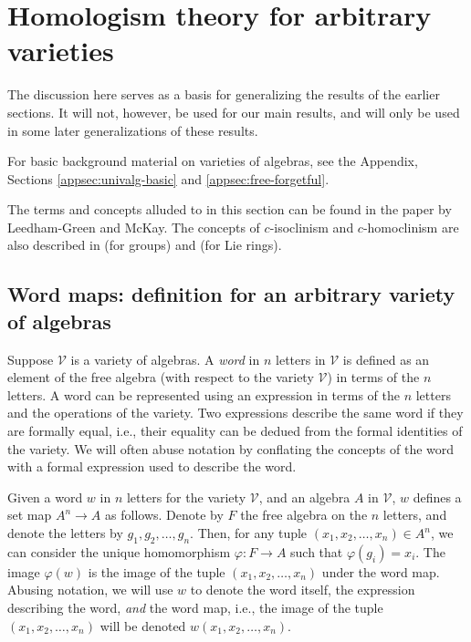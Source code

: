 \documentclass{ucetd}
\begin{document}
\section{Homologism theory for arbitrary varieties}\label{appsec:homologism-theory}

The discussion here serves as a basis for generalizing the results of
the earlier sections. It will not, however, be used for our main
results, and will only be used in some later generalizations of these
results.

For basic background material on varieties of algebras, see the
Appendix, Sections \ref{appsec:univalg-basic} and
\ref{appsec:free-forgetful}.

The terms and concepts alluded to in this section can be found in the
paper \cite{Baerinvariantsandisolosigms} by Leedham-Green and
McKay. The concepts of $c$-isoclinism and $c$-homoclinism are also
described in \cite{Hekster} (for groups) and \cite{Moghaddametal} (for
Lie rings).

\subsection{Word maps: definition for an arbitrary variety of algebras}\label{appsec:word-maps}

Suppose $\mathcal{V}$ is a variety of algebras. A {\em word} in $n$
letters in $\mathcal{V}$ is defined as an element of the free algebra
(with respect to the variety $\mathcal{V}$) in terms of the $n$
letters. A word can be represented using an expression in terms of the
$n$ letters and the operations of the variety. Two expressions
describe the same word if they are formally equal, i.e., their
equality can be dedued from the formal identities of the variety. We
will often abuse notation by conflating the concepts of the word with
a formal expression used to describe the word.

Given a word $w$ in $n$ letters for the variety $\mathcal{V}$, and an
algebra $A$ in $\mathcal{V}$, $w$ defines a set map $A^n \to A$ as
follows. Denote by $F$ the free algebra on the $n$ letters, and denote
the letters by $g_1,g_2,\dots,g_n$. Then, for any tuple
$(x_1,x_2,\dots,x_n) \in A^n$, we can consider the unique homomorphism
$\varphi:F \to A$ such that $\varphi(g_i) = x_i$. The image
$\varphi(w)$ is the image of the tuple $(x_1,x_2,\dots,x_n)$ under the
word map. Abusing notation, we will use $w$ to denote the word itself,
the expression describing the word, {\em and} the word map, i.e., the
image of the tuple $(x_1,x_2,\dots,x_n)$ will be denoted
$w(x_1,x_2,\dots,x_n)$.
\end{document}
